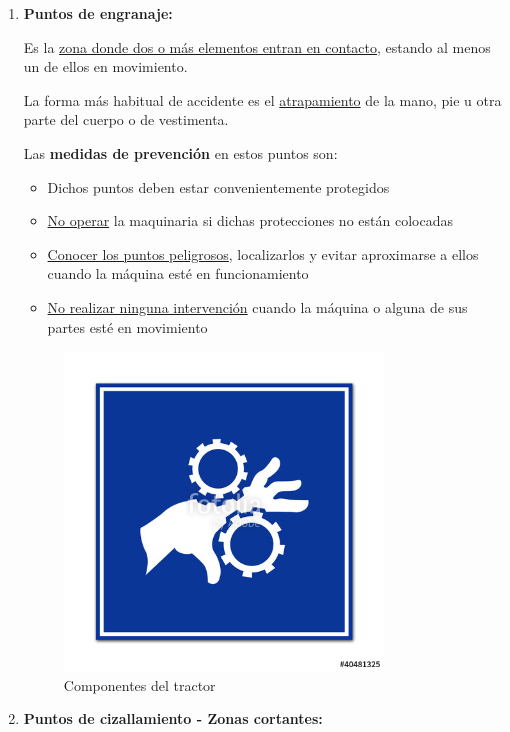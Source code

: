 \documentclass[a4paper,12pt,oneside]{book}
\begin{document}
\begin{enumerate}
\item \textbf{Puntos de engranaje:}
\label{sec:org4cc2895}

Es la \uline{zona donde dos o más elementos entran en contacto}, estando al menos un
de ellos en movimiento.

La forma más habitual de accidente es el \uline{atrapamiento} de la mano, pie u otra
parte del cuerpo o de vestimenta.

Las \textbf{medidas de prevención} en estos puntos son:
\begin{itemize}
\item Dichos puntos deben estar convenientemente protegidos
\item \uline{No operar} la maquinaria si dichas protecciones no están colocadas
\item \uline{Conocer los puntos peligrosos}, localizarlos y evitar aproximarse a ellos
cuando la máquina esté en funcionamiento
\item \uline{No realizar ninguna intervención} cuando la máquina o alguna de sus partes
esté en movimiento
\end{itemize}

\begin{figure}[htbp]
\centering
\includegraphics[width=0.8\textwidth]{./img_0009/riesgo_engranaje.jpg}
\caption{Componentes del tractor}
\end{figure}

\item \textbf{Puntos de cizallamiento - Zonas cortantes:}
\label{sec:org105b774}


\end{enumerate}
\end{document}

